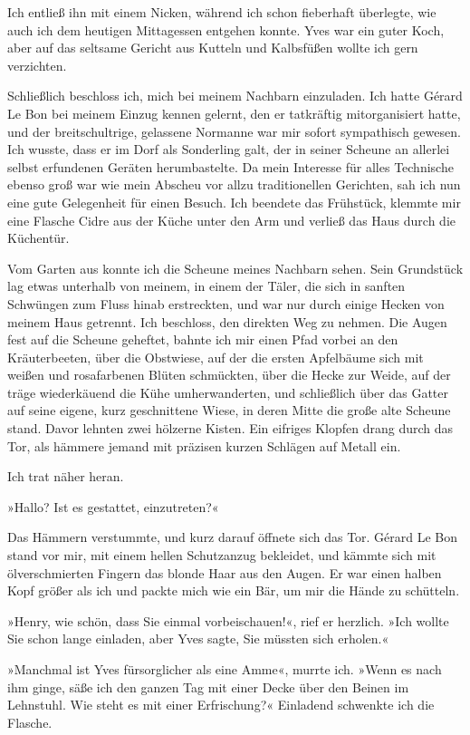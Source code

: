 Ich entließ ihn mit einem Nicken, während ich schon fieberhaft
überlegte, wie auch ich dem heutigen Mittagessen entgehen konnte.
Yves war ein guter Koch, aber auf das seltsame Gericht aus Kutteln
und Kalbsfüßen wollte ich gern verzichten.

Schließlich beschloss ich, mich bei meinem Nachbarn einzuladen. Ich
hatte Gérard Le Bon bei meinem Einzug kennen gelernt, den er
tatkräftig mitorganisiert hatte, und der breitschultrige, gelassene
Normanne war mir sofort sympathisch gewesen. Ich wusste, dass er im
Dorf als Sonderling galt, der in seiner Scheune an allerlei selbst
erfundenen Geräten herumbastelte. Da mein Interesse für alles
Technische ebenso groß war wie mein Abscheu vor allzu
traditionellen Gerichten, sah ich nun eine gute Gelegenheit für
einen Besuch. Ich beendete das Frühstück, klemmte mir eine Flasche
Cidre aus der Küche unter den Arm und verließ das Haus durch die
Küchentür.

\bigpar

Vom Garten aus konnte ich die Scheune meines Nachbarn sehen. Sein
Grundstück lag etwas unterhalb von meinem, in einem der Täler, die
sich in sanften Schwüngen zum Fluss hinab erstreckten, und war nur
durch einige Hecken von meinem Haus getrennt. Ich beschloss, den
direkten Weg zu nehmen. Die Augen fest auf die Scheune geheftet,
bahnte ich mir einen Pfad vorbei an den Kräuterbeeten, über die
Obstwiese, auf der die ersten Apfelbäume sich mit weißen und
rosafarbenen Blüten schmückten, über die Hecke zur Weide, auf der
träge wiederkäuend die Kühe umherwanderten, und schließlich über
das Gatter auf seine eigene, kurz geschnittene Wiese, in deren
Mitte die große alte Scheune stand. Davor lehnten zwei hölzerne
Kisten. Ein eifriges Klopfen drang durch das Tor, als hämmere
jemand mit präzisen kurzen Schlägen auf Metall ein.

Ich trat näher heran.

»Hallo? Ist es gestattet, einzutreten?«

Das Hämmern verstummte, und kurz darauf öffnete sich das Tor.
Gérard Le Bon stand vor mir, mit einem hellen Schutzanzug
bekleidet, und kämmte sich mit ölverschmierten Fingern das blonde
Haar aus den Augen. Er war einen halben Kopf größer als ich und
packte mich wie ein Bär, um mir die Hände zu schütteln.

»Henry, wie schön, dass Sie einmal vorbeischauen!«, rief er
herzlich. »Ich wollte Sie schon lange einladen, aber Yves sagte,
Sie müssten sich erholen.«

»Manchmal ist Yves fürsorglicher als eine Amme«, murrte ich. »Wenn
es nach ihm ginge, säße ich den ganzen Tag mit einer Decke über den
Beinen im Lehnstuhl. Wie steht es mit einer Erfrischung?« Einladend
schwenkte ich die Flasche.

